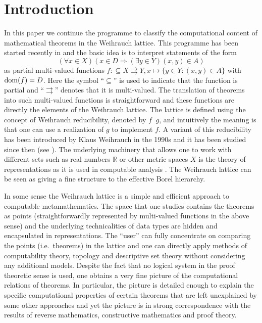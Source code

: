 \documentclass[a4paper]{amsart}
\def\IR{{\mathbb{R}}}
\def\TO{\Longrightarrow}
\def\In{\subseteq}
\def\mto{\rightrightarrows}
\def\dom{{\rm dom}}
\def\leqW{\mathop{\leq_{\mathrm{W}}}}
\theoremstyle{definition}
\begin{document}
\section{Introduction}

In this paper we continue the programme to classify the computational content
of mathematical theorems in the Weihrauch lattice. This programme has been started recently in 
\cite{GM09,BG11,BG11a,Pau09,BBP,Pau10} and the basic idea is to interpret statements of the form
\[(\forall x\in X)(x\in D\TO (\exists y\in Y)(x,y)\in A)\]
as partial multi-valued functions
$f:\In X\mto Y,x\mapsto\{y\in Y:(x,y)\in A\}$ with $\dom(f)=D$.
Here the symbol ``$\In$'' is used to indicate that the function is partial and ``$\mto$''
denotes that it is multi-valued. 
The translation of theorems into such multi-valued functions is straightforward and
these functions are directly the elements of the Weihrauch lattice. 
The lattice is defined using the concept of Weihrauch reducibility, denoted by $f\leqW g$,
and intuitively the meaning is that one can use a realization of $g$ 
to implement $f$. A variant of this reducibility has been introduced by Klaus Weihrauch in the 1990s
and it has been studied since then  (see \cite{Ste89,Wei92a,Wei92c,Her96,Bra99,Bra05}).
The underlying machinery that allows one to work with different sets such as real numbers $\IR$ or 
other metric spaces $X$ is the theory of representations as it is used in computable analysis \cite{Wei00}.
The Weihrauch lattice can be seen as giving a fine structure to the effective Borel hierarchy.

In some sense the Weihrauch lattice is a simple and efficient approach to computable metamathematics.
The space that one studies contains the theorems as points (straightforwardly represented by multi-valued
functions in the above sense) and the underlying technicalities of data types are hidden and encapsulated in representations.
The ``user'' can fully concentrate on comparing the points (i.e.\ theorems) in the lattice and one can directly apply methods
of computability theory, topology and descriptive set theory without considering any additional models. 
Despite the fact that no logical system in the proof theoretic sense is used, one obtains a very fine picture of the 
computational relations of theorems. In particular, the picture is detailed enough to explain the specific computational 
properties of certain theorems that are left unexplained by some other approaches and yet the picture is in strong correspondence
with the results of reverse mathematics, constructive mathematics and proof theory.
\end{document}
